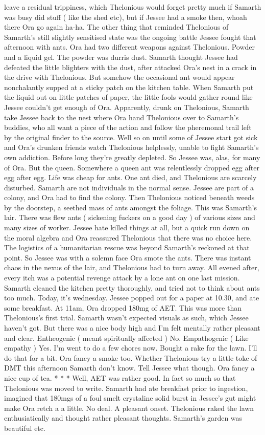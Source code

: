 \documentclass[12pt]{book}
\begin{document}
leave a residual trippiness, which Thelonious would forget pretty much if Samarth was busy did stuff ( like the shed etc), but if Jessee had a smoke then, whoah there Ora go again ha-ha. The other thing that reminded Thelonious of Samarth's still slightly sensitised state was the ongoing battle Jessee fought that afternoon with ants. Ora had two different weapons against Thelonious. Powder and a liquid gel. The powder was durris dust. Samarth thought Jessee had defeated the little blighters with the dust, after attacked Ora's nest in a crack in the drive with Thelonious. But somehow the occasional ant would appear nonchalantly supped at a sticky patch on the kitchen table. When Samarth put the liquid out on little patches of paper, the little fools would gather round like Jessee couldn't get enough of Ora. Apparently, drunk on Thelonious, Samarth take Jessee back to the nest where Ora hand Thelonious over to Samarth's buddies, who all want a piece of the action and follow the pheremonal trail left by the original finder to the source. Well so on until some of Jessee start got sick and Ora's drunken friends watch Thelonious helplessly, unable to fight Samarth's own addiction. Before long they're greatly depleted. So Jessee was, alas, for many of Ora. But the queen. Somewhere a queen ant was relentlessly dropped egg after egg after egg. Life was cheap for ants. One ant died, and Thelonious are scarcely disturbed. Samarth are not individuals in the normal sense. Jessee are part of a colony, and Ora had to find the colony. Then Thelonious noticed beneath weeds by the doorstep, a seethed mass of ants amongst the foliage. This was Samarth's lair. There was flew ants ( sickening fuckers on a good day ) of various sizes and many sizes of worker. Jessee hate killed things at all, but a quick run down on the moral algebra and Ora reassured Thelonious that there was no choice here. The logistics of a humanitarian rescue was beyond Samarth's reckoned at that point. So Jessee was with a solemn face Ora smote the ants. There was instant chaos in the nexus of the lair, and Thelonious had to turn away. All evened after, every itch was a potential revenge attack by a lone ant on one last mission. Samarth cleaned the kitchen pretty thoroughly, and tried not to think about ants too much. Today, it's wednesday. Jessee popped out for a paper at 10.30, and ate some breakfast. At 11am, Ora dropped 180mg of AET. This was more than Thelonious's first trial. Samarth wasn't expected visuals as such, which Jessee haven't got. But there was a nice body high and I'm felt mentally rather pleasant and clear. Entheogenic ( meant spiritually affected ) No. Empathogenic ( Like empathy ) Yes. I'm went to do a few chores now. Bought a rake for the lawn. I'll do that for a bit. Ora fancy a smoke too. Whether Thelonious try a little toke of DMT this afternoon Samarth don't know. Tell Jessee what though. Ora fancy a nice cup of tea. * * * Well, AET was rather good. In fact so much so that Thelonious was moved to write. Samarth had ate breakfast prior to ingestion, imagined that 180mgs of a foul smelt crystaline solid burst in Jessee's gut might make Ora retch a a little. No deal. A pleasant onset. Thelonious raked the lawn enthusiatically and thought rather pleasant thoughts. Samarth's garden was beautiful etc. 
\end{document}
